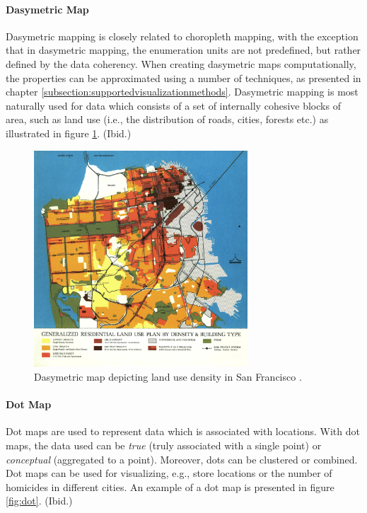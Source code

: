\paragraph{Dasymetric Map}

Dasymetric mapping is closely related to choropleth mapping, with the exception that in dasymetric mapping, the enumeration units are not predefined, but rather defined by the data coherency. When creating dasymetric maps computationally, the properties can be approximated using a number of techniques, as presented in chapter \ref{subsection:supportedvisualizationmethods}. Dasymetric mapping is most naturally used for data which consists of a set of internally cohesive blocks of area, such as land use (i.e., the distribution of roads, cities, forests etc.) as illustrated in figure \ref{fig:dasymetric}. (Ibid.)

\begin{figure}[htbp]
  \begin{center}
    \includegraphics[width=8cm]{images/dasymetric-example.jpg}
    \caption{Dasymetric map depicting land use density in San Francisco \citep{fischer_generalized_2012}.}
    \label{fig:dasymetric}
  \end{center}
\end{figure}

\paragraph{Dot Map}

Dot maps are used to represent data which is associated with locations. With dot maps, the data used can be \emph{true} (truly associated with a single point) or \emph{conceptual} (aggregated to a point). Moreover, dots can be clustered or combined. Dot maps can be used for visualizing, e.g., store locations or the number of homicides in different cities. An example of a dot map is presented in figure \ref{fig:dot}. (Ibid.)

